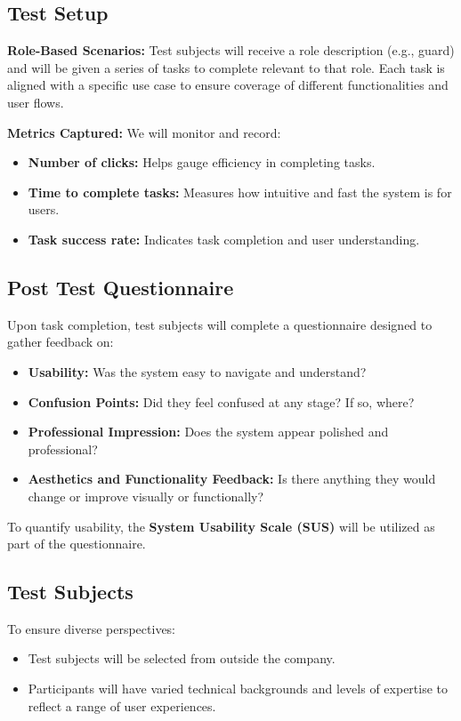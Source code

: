 \documentclass{article}
\begin{document}
\subsection{Test Setup}
\textbf{Role-Based Scenarios:} Test subjects will receive a role description (e.g., guard) and will be given a series of tasks to complete relevant to that role. Each task is aligned with a specific use case to ensure coverage of different functionalities and user flows.

\textbf{Metrics Captured:}
We will monitor and record:
\begin{itemize}
    \item \textbf{Number of clicks:} Helps gauge efficiency in completing tasks.
    \item \textbf{Time to complete tasks:} Measures how intuitive and fast the system is for users.
    \item \textbf{Task success rate:} Indicates task completion and user understanding.
\end{itemize}


\subsection{Post Test Questionnaire}

Upon task completion, test subjects will complete a questionnaire designed to gather feedback on:
\begin{itemize}
    \item \textbf{Usability:} Was the system easy to navigate and understand?
    \item \textbf{Confusion Points:} Did they feel confused at any stage? If so, where?
    \item \textbf{Professional Impression:} Does the system appear polished and professional?
    \item \textbf{Aesthetics and Functionality Feedback:} Is there anything they would change or improve visually or functionally?
\end{itemize}

To quantify usability, the \textbf{System Usability Scale (SUS)} will be utilized as part of the questionnaire.

\subsection{Test Subjects}
To ensure diverse perspectives:
\begin{itemize}
    \item Test subjects will be selected from outside the company.
    \item Participants will have varied technical backgrounds and levels of expertise to reflect a range of user experiences.
\end{itemize}
\end{document}
